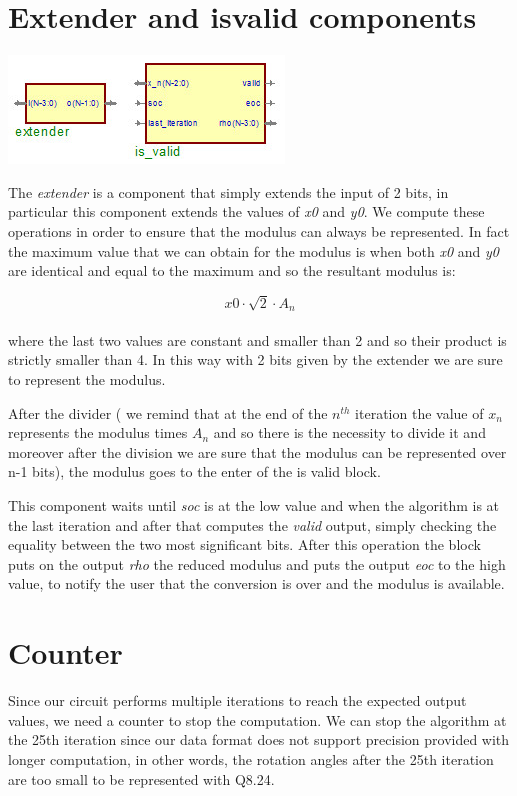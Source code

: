 \documentclass[12pt,a4paper]{report}
\begin{document}
\section{Extender and is\textunderscore valid components}
\begin{center}
\includegraphics{img/isvalid.jpg}\\
\end{center}
The \emph{extender} is a component that simply extends the input of 2 bits, in particular this component extends the values of \emph{x0} and \emph{y0}. We compute these operations in order to ensure that the modulus can always be represented. In fact the maximum value that we can obtain for the modulus is when both \emph{x0} and \emph{y0} are identical and equal to the maximum and so the resultant modulus is:

		\begin{equation}
		x0 \cdot \sqrt{2} \cdot A_{n}
		\end{equation}
	\\	
where the last two values are constant and smaller than 2 and so their product is strictly smaller than 4. In this way with 2 bits given by the extender we are sure to represent the modulus. 

After the divider ( we remind that at the end of the $n^{th}$ iteration the value of $x_{n}$ represents the modulus times $A_{n}$ and so there is the necessity to divide it and moreover after the division we are sure that the modulus can be represented over n-1 bits), the modulus goes to the enter of the is \textunderscore valid block. 

This component waits until \emph{soc} is at the low value and when the algorithm is at the last iteration and after that computes the \emph{valid} output, simply checking the equality between the two most significant bits. After this operation the block puts on the output \emph{rho} the reduced modulus and puts the output \emph{eoc} to the high value, to notify the user that the conversion is over and the modulus is available.

\section{Counter}
Since our circuit performs multiple iterations to reach the expected output values, we need a counter to stop the computation.
We can stop the algorithm at the 25th iteration since our data format does not support precision provided with longer computation, in other words, the rotation angles after the 25th iteration are too small to be represented with Q8.24.
\end{document}
